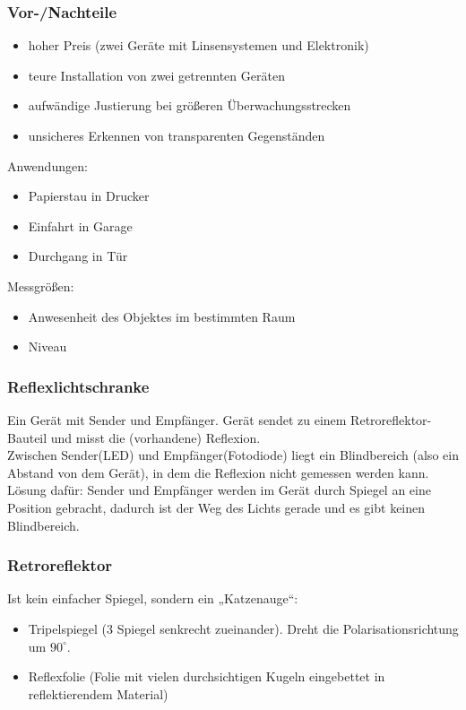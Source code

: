 \documentclass{scrreprt}
\begin{document}
\subsubsection*{Vor-/Nachteile}
\begin{itemize}[label=$-$]
\item hoher Preis (zwei Geräte mit Linsensystemen und Elektronik)
\item teure Installation von zwei getrennten Geräten
\item aufwändige Justierung bei größeren Überwachungsstrecken
\item unsicheres Erkennen von transparenten Gegenständen
\end{itemize}
Anwendungen:
\begin{itemize}
\item Papierstau in Drucker
\item Einfahrt in Garage
\item Durchgang in Tür
\end{itemize}
Messgrößen:
\begin{itemize}
\item Anwesenheit des Objektes im bestimmten Raum
\item Niveau
\end{itemize}

\subsubsection{Reflexlichtschranke}
Ein Gerät mit Sender und Empfänger. Gerät sendet zu einem Retroreflektor-Bauteil und misst die (vorhandene) Reflexion.\\
Zwischen Sender(LED) und Empfänger(Fotodiode) liegt ein Blindbereich (also ein Abstand von dem Gerät), in dem die Reflexion nicht gemessen werden kann. Lösung dafür: Sender und Empfänger werden im Gerät durch Spiegel an eine Position gebracht, dadurch ist der Weg des Lichts gerade und es gibt keinen Blindbereich.

\subsubsection*{Retroreflektor}
Ist kein einfacher Spiegel, sondern ein „Katzenauge“: 
\begin{itemize}
\item Tripelspiegel (3 Spiegel senkrecht zueinander). Dreht die Polarisationsrichtung um $90^\circ$.
\item Reflexfolie (Folie mit vielen durchsichtigen Kugeln eingebettet in reflektierendem Material)
\end{itemize}
\end{document}

